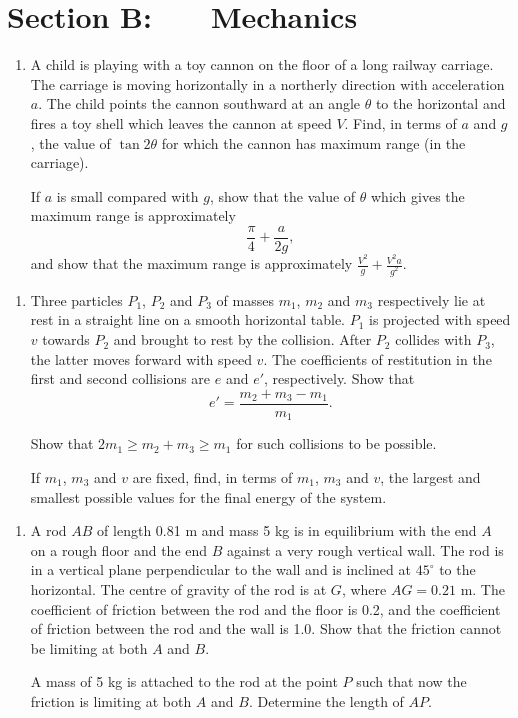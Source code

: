 \documentclass[a4, 11pt]{report}
\newlength{\qspace}
\newcounter{qnumber}
\newenvironment{question}%
 {\vspace{\qspace}
  \begin{enumerate}[\bfseries 1\quad][10]%
    \setcounter{enumi}{\value{qnumber}}%
    \item%
 }
{
  \end{enumerate}
  \filbreak
  \stepcounter{qnumber}
 }
\def\ge{\geqslant}
\begin{document}
		
	
\newpage
\section*{Section B: \ \ \ Mechanics}


	
\begin{question}
A child is playing with a toy cannon on the floor of a long
railway carriage. 
The carriage is moving horizontally in a northerly direction with 
acceleration $a$. The child points the cannon southward at an angle $\theta$
to the horizontal and fires a toy shell which 
leaves the cannon at speed $V$.  Find, in terms of $a$ and $g$,
the value of $\tan 2\theta$  
for which the cannon has maximum range (in the carriage). 

If $a$ is small compared with $g$, show that the value of $\theta$ which 
gives the maximum range is approximately  
\[
\frac \pi 4 + \frac a {2g},
\]
and show that the maximum range is approximately 
$\displaystyle
\frac {V^2} g + \frac {V^2a}{g^2}.
$
	\end{question}
	
\begin{question}	
Three particles $P_1$, $P_2$ and $P_3$
of masses $m_{1}$, $m_{2}$ and  $m_{3}$ respectively 
lie at rest in a straight line on a smooth horizontal table. 
$P_1$ is projected with speed $v$ 
towards $P_2$ and brought to rest by the collision. 
After $P_2$  collides with $P_3$, 
the latter moves forward with speed $v$. The coefficients of restitution
in the first and second collisions are $e$ and $e'$, respectively.
Show that 
\[
e'=
\frac{m_{2}+m_{3}-m_{1}}{m_{1}}.
\] 
 
Show that 
$2m_1\ge m_2 +m_3\ge m_1$
for such collisions to be possible.

If $m_1$,  $m_3$ and $v$ are fixed, find,  in terms of $m_1$, $m_3$ and 
$v$,
the largest and smallest possible
values for the final  energy of the system.
\end{question}


\begin{question}
A rod $AB$ of length 0.81 m and mass 5 kg is
in equilibrium with the end $A$ on a rough floor and the end $B$ against
a very rough vertical wall. The rod is in a vertical plane perpendicular
to the wall and is inclined at $45^{\circ}$ to the horizontal. 
 The centre of gravity of the rod is at $G$, where $AG = 0.21$ m. 
The coefficient of friction between the
rod and the floor is 0.2, and the coefficient of friction
between the rod and the wall is 1.0. Show that the friction cannot 
be limiting at both $A$ and $B$.


A mass of 5 kg is attached to the rod at the point $P$ such that now
the friction is limiting  at both $A$ and $B$. Determine the length of 
$AP$. 
\end{question}
	
\end{document}
